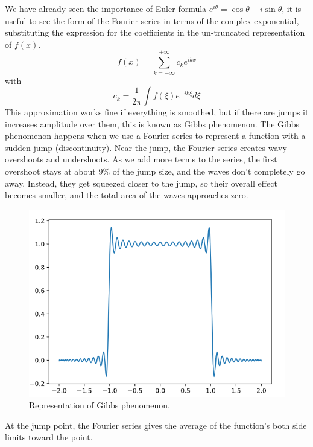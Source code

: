 We have already seen the importance of Euler formula $e^{i\theta}=\cos\theta+i\sin\theta$, it is useful to see the form of the Fourier series in terms of the complex exponential, substituting the expression for the coefficients in the un-truncated representation of $f(x)$.
\begin{equation}\label{eq.complex Fourier}
	f(x)=\displaystyle\sum_{k=-\infty}^{+\infty}c_ke^{ikx}
\end{equation}
with
\begin{equation}
	c_k=\frac{1}{2\pi}\int f(\xi)e^{-ik\xi}d\xi
\end{equation}
This approximation works fine if everything is smoothed, but if there are jumps it increases amplitude over them, this is known as Gibbs phenomenon.
The Gibbs phenomenon happens when we use a Fourier series to represent a function with a sudden jump (discontinuity). Near the jump, the Fourier series creates wavy overshoots and undershoots. As we add more terms to the series, the first overshoot stays at about 9\% of the jump size, and the waves don’t completely go away. Instead, they get squeezed closer to the jump, so their overall effect becomes smaller, and the total area of the waves approaches zero.
\begin{figure}
	\centering
	\includegraphics[width=0.5\linewidth]{uploads/Screenshot 2024-11-14 170405.png}
	\caption{Representation of Gibbs phenomenon.}
	\label{fig:Gibbs}
\end{figure}
At the jump point, the Fourier series gives the average of the function's both side limits toward the point.

